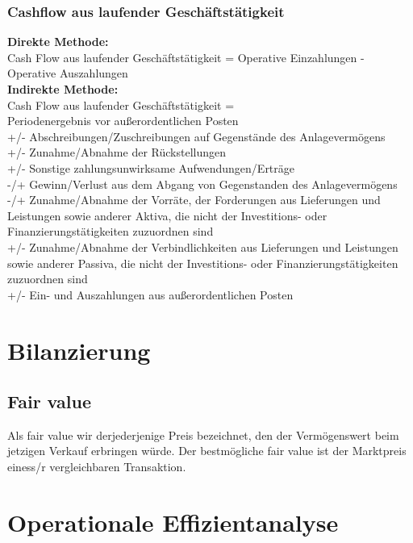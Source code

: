 \documentclass{article}
\begin{document}
\subsubsection{Cashflow aus laufender Geschäftstätigkeit}

\textbf{Direkte Methode:}\\
Cash Flow aus laufender Geschäftstätigkeit = Operative Einzahlungen - Operative Auszahlungen \\
\textbf{Indirekte Methode:}\\
Cash Flow aus laufender Geschäftstätigkeit = \\
Periodenergebnis vor außerordentlichen Posten\\
+/- Abschreibungen/Zuschreibungen auf Gegenstände des Anlagevermögens\\
+/- Zunahme/Abnahme der Rückstellungen\\
+/- Sonstige zahlungsunwirksame Aufwendungen/Erträge\\
-/+ Gewinn/Verlust aus dem Abgang von Gegenstanden des Anlagevermögens\\
-/+ Zunahme/Abnahme der Vorräte, der Forderungen aus Lieferungen und Leistungen sowie anderer Aktiva, die nicht der Investitions- oder Finanzierungstätigkeiten zuzuordnen sind \\
+/- Zunahme/Abnahme der Verbindlichkeiten aus Lieferungen und Leistungen sowie anderer Passiva, die nicht der Investitions- oder Finanzierungstätigkeiten zuzuordnen sind\\
+/- Ein- und Auszahlungen aus außerordentlichen Posten\\

\section{Bilanzierung}

\subsection{Fair value}

Als fair value wir derjederjenige Preis bezeichnet, den der Vermögenswert beim jetzigen Verkauf erbringen würde.
Der bestmögliche fair value ist der Marktpreis einess/r vergleichbaren Transaktion.
\section{Operationale Effizientanalyse}
\end{document}
